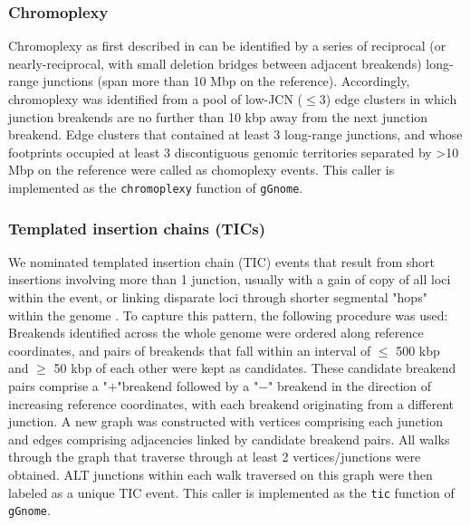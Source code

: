 \documentclass[phd,tocprelim]{cornell}
\newcommand{\ttt}[1]{\texttt{#1}}
\begin{document}
\subsubsection*{Chromoplexy}

Chromoplexy as first described in \cite{baca2013} can be identified by a series of reciprocal (or nearly-reciprocal, with small deletion bridges between adjacent breakends) long-range junctions (span more than 10 Mbp on the reference). Accordingly, chromoplexy was identified from a pool of low-JCN ($\leq 3$) edge clusters in which junction breakends are no further than 10 kbp away from the next junction breakend. Edge clusters that contained at least 3 long-range junctions, and whose footprints occupied at least 3 discontiguous genomic territories separated by >10 Mbp on the reference were called as chomoplexy events. This caller is implemented as the \ttt{chromoplexy} function of \ttt{gGnome}.

\subsubsection*{Templated insertion chains (TICs)}

We nominated templated insertion chain (TIC) events that result from short insertions involving more than 1 junction, usually with a gain of copy of all loci within the event, or linking disparate loci through shorter segmental "hops" within the genome \cite{Li2020sv}. To capture this pattern, the following procedure was used: Breakends identified across the whole genome were ordered along reference coordinates, and pairs of breakends that fall within an interval of $\le$ 500 kbp and $\ge$ 50 kbp of each other were kept as candidates. These candidate breakend pairs comprise a "$+$"breakend followed by a "$-$" breakend in the direction of increasing reference coordinates, with each breakend originating from a different junction. A new graph was constructed with vertices comprising each junction and edges comprising adjacencies linked by candidate breakend pairs. All walks through the graph that traverse through at least 2 vertices/junctions were obtained. ALT junctions within each  walk traversed on this graph were then labeled as a unique TIC event.  This caller is implemented as the \ttt{tic} function of \ttt{gGnome}.



\end{document}
